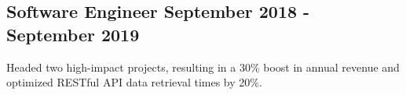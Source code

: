 \subsection{Software Engineer \hfill September 2018 - September 2019}
\begin{zitemize}
\item Headed two high-impact projects, resulting in a 30\% boost in annual revenue and optimized RESTful API data retrieval times by 20\%.
\end{zitemize}